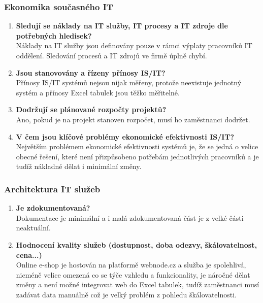 \documentclass{article}
\begin{document}
\subsubsection*{Ekonomika současného IT}

\begin{enumerate}
    \item \textbf{Sledují se náklady na IT služby, IT procesy a IT zdroje dle potřebných hledisek?} \\
        Náklady na IT služby jsou definovány pouze v rámci výplaty pracovníků IT oddělení.
        Sledování procesů a IT zdrojů ve firmě úplně chybí.

    \item \textbf{Jsou stanovovány a řízeny přínosy IS/IT?} \\
        Přínosy IS/IT systémů nejsou nijak měřeny, protože neexistuje jednotný systém a přínosy Excel tabulek jsou těžko měřitelné.

    \item \textbf{Dodržují se plánované rozpočty projektů?} \\
    Ano, pokud je na projekt stanoven rozpočet, musí ho zaměstnanci dodržet.

    \item \textbf{V čem jsou klíčové problémy ekonomické efektivnosti IS/IT?} \\
        Největším problémem ekonomické efektivnosti systémů je, že se jedná o velice obecné řešení,
        které není přizpůsobeno potřebám jednotlivých pracovníků a je tudíž nákladné dělat i minimální změny.
\end{enumerate}

\subsubsection*{Architektura IT služeb}
\begin{enumerate}
    \item \textbf{Je zdokumentovaná?} \\
        Dokumentace je minimální a i malá zdokumentovaná část je z velké části neaktuální.

    \item \textbf{Hodnocení kvality služeb (dostupnost, doba odezvy, škálovatelnost, cena...)} \\
        Online e-shop je hostován na platformě webnode.cz a služba je spolehlivá, nicméně velice omezená co se týče vzhledu a funkcionality, je náročné dělat změny a není možné integrovat web do Excel tabulek, tudíž zaměstnanci musí zadávat data manuálně což je velký problém z pohledu škálovatelnosti.
\end{enumerate}
\end{document}
